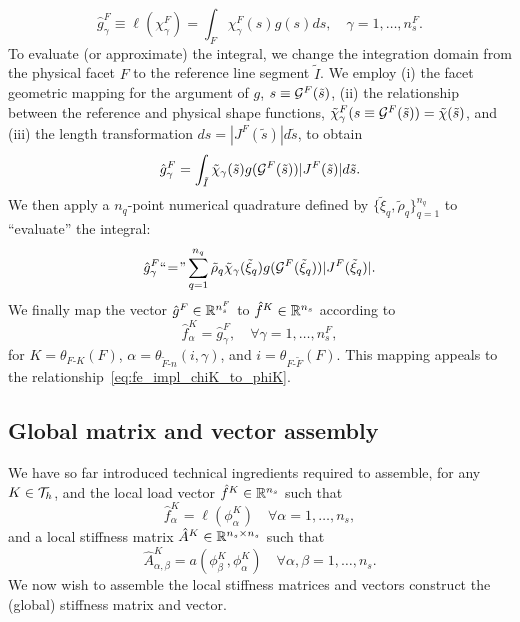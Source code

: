 \begin{equation*}
  \hat g^F_\gamma \equiv \ell(\chi_\gamma^F) = \int_{F} \chi^F_\gamma(s) g(s) ds, \quad \gamma = 1,\dots,n_s^F.
\end{equation*}
To evaluate (or approximate) the integral, we change the integration domain from the physical facet $F$ to the reference line segment $\tilde I$.  We employ (i) the facet geometric mapping for the argument of $g$, $s \equiv \mathcal{G}^F(\tilde s)$, (ii) the relationship between the reference and physical shape functions, $\tilde \chi^F_\gamma(s \equiv \mathcal{G}^F(\tilde s)) = \tilde \chi(\tilde s)$, and (iii) the length transformation $ds = |J^F(\tilde s)|d \tilde s$, to obtain
\begin{equation*}
  \hat g^F_\gamma = \int_{\tilde I} \tilde \chi_\gamma(\tilde s) g(\mathcal{G}^F(\tilde s)) |J^F(\tilde s)| d \tilde s.
\end{equation*}
We then apply a $n_q$-point numerical quadrature defined by $\{ \tilde \xi_q, \tilde \rho_q \}_{q=1}^{n_q}$ to ``evaluate'' the integral:
\begin{equation*}
  \hat g^F_\gamma
  \text{``}\hspace{-0.2em}=\hspace{-0.2em}\text{''}
  \sum_{q=1}^{n_q} \tilde \rho_q \tilde \chi_\gamma(\tilde \xi_q) g(\mathcal{G}^F(\tilde \xi_q)) |J^F(\tilde \xi_q)| .
\end{equation*}
We finally map the vector $\hat g^F \in \mathbb{R}^{n_s^F}$ to $\hat f^K \in \mathbb{R}^{n_s}$ according to
\begin{equation*}
  \hat f^{K}_{\alpha} = \hat g^F_\gamma, \quad \forall \gamma = 1,\dots,n_s^F,
\end{equation*}
for  $K = \theta_{F\text{-}K}(F)$, $\alpha = \theta_{\tilde F\text{-}n}(i,\gamma)$, and $i = \theta_{F\text{-}\tilde F}(F)$.  This mapping appeals to the relationship~\eqref{eq:fe_impl_chiK_to_phiK}.



\subsection{Global matrix and vector assembly}
We have so far introduced technical ingredients required to assemble, for any $K \in \mathcal{T}_h$, 
and the local load vector $\hat f^K \in \mathbb{R}^{n_s}$ such that
\begin{equation*}
  \hat f^K_\alpha = \ell(\phi^K_\alpha) \quad \forall \alpha = 1,\dots,n_s,
\end{equation*}
and a local stiffness matrix $\hat A^K \in \mathbb{R}^{n_s \times n_s}$ such that
\begin{equation*}
  \hat A^K_{\alpha,\beta} = a(\phi^K_\beta,\phi^K_\alpha) \quad \forall \alpha, \beta = 1,\dots,n_s.
\end{equation*}
We now wish to assemble the local stiffness matrices and vectors construct the (global) stiffness matrix and vector.

